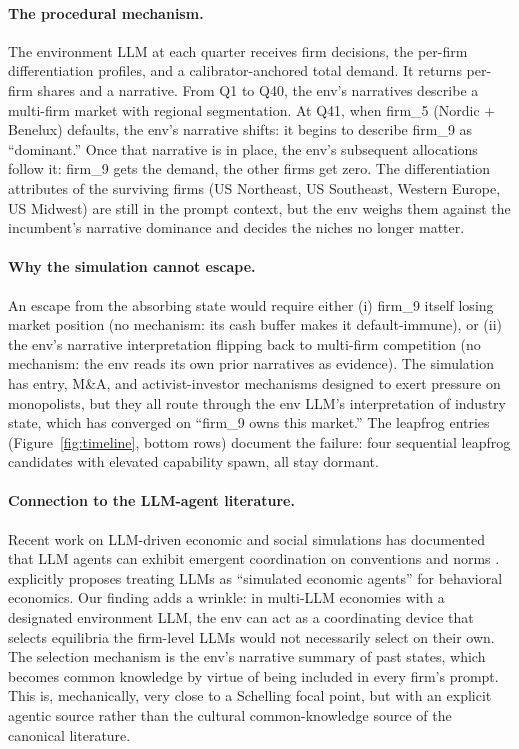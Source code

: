 \documentclass[11pt]{article}
\begin{document}
\paragraph{The procedural mechanism.} The environment LLM at each quarter receives firm decisions, the per-firm differentiation profiles, and a calibrator-anchored total demand. It returns per-firm shares and a narrative. From Q1 to Q40, the env's narratives describe a multi-firm market with regional segmentation. At Q41, when firm\_5 (Nordic + Benelux) defaults, the env's narrative shifts: it begins to describe firm\_9 as ``dominant.'' Once that narrative is in place, the env's subsequent allocations follow it: firm\_9 gets the demand, the other firms get zero. The differentiation attributes of the surviving firms (US Northeast, US Southeast, Western Europe, US Midwest) are still in the prompt context, but the env weighs them against the incumbent's narrative dominance and decides the niches no longer matter.

\paragraph{Why the simulation cannot escape.} An escape from the absorbing state would require either (i) firm\_9 itself losing market position (no mechanism: its cash buffer makes it default-immune), or (ii) the env's narrative interpretation flipping back to multi-firm competition (no mechanism: the env reads its own prior narratives as evidence). The simulation has entry, M\&A, and activist-investor mechanisms designed to exert pressure on monopolists, but they all route through the env LLM's interpretation of industry state, which has converged on ``firm\_9 owns this market.'' The leapfrog entries (Figure~\ref{fig:timeline}, bottom rows) document the failure: four sequential leapfrog candidates with elevated capability spawn, all stay dormant.

\paragraph{Connection to the LLM-agent literature.} Recent work on LLM-driven economic and social simulations has documented that LLM agents can exhibit emergent coordination on conventions and norms \citep{Park2023,AherArriagaKalai2023,Argyle2023}. \citet{Horton2023} explicitly proposes treating LLMs as ``simulated economic agents'' for behavioral economics. Our finding adds a wrinkle: in multi-LLM economies with a designated environment LLM, the env can act as a coordinating device that selects equilibria the firm-level LLMs would not necessarily select on their own. The selection mechanism is the env's narrative summary of past states, which becomes common knowledge by virtue of being included in every firm's prompt. This is, mechanically, very close to a Schelling focal point, but with an explicit agentic source rather than the cultural common-knowledge source of the canonical literature.
\end{document}
